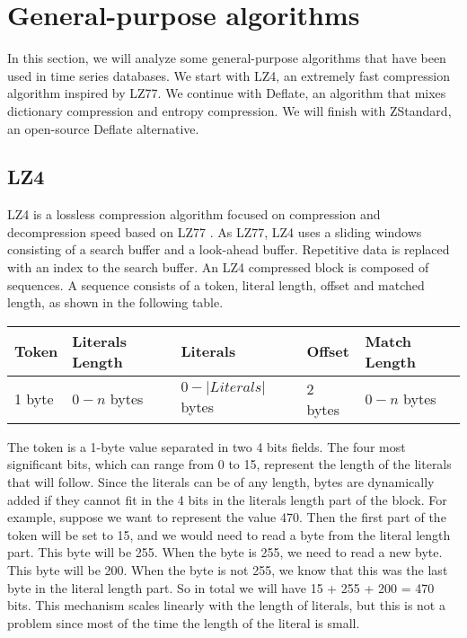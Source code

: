\section{General-purpose algorithms}
In this section, we will analyze some general-purpose algorithms that have been used in
time series databases. We start with LZ4, an extremely fast compression algorithm inspired
by LZ77. We continue with Deflate, an algorithm that mixes dictionary compression and entropy
compression. We will finish with ZStandard, an open-source Deflate alternative.

\subsection{LZ4}
LZ4 is a lossless compression algorithm focused on compression and decompression speed
based on LZ77 \cite{ziv1977universal}\cite{lz42019lz4lz4}. As LZ77, LZ4 uses a sliding windows
consisting of a search buffer and a look-ahead buffer. Repetitive data is replaced with
an index to the search buffer. An LZ4 compressed block is composed of sequences.
A sequence consists of a token, literal length, offset and matched length, as
shown in the following table.
\begin{table}[!htbp]
\centering
\begin{tabular}{l|l|l|l|l}
\textbf{Token} & \textbf{Literals Length} & \textbf{Literals} & \textbf{Offset} & \textbf{Match Length} \\ 
\hline
1 byte & $0-n$ bytes & $0-|Literals|$ bytes & 2 bytes & $0-n$ bytes \\
\end{tabular}
\end{table}
The token is a 1-byte value separated in two 4 bits fields. The four most significant bits,
which can range from 0 to 15, represent the length of the literals that will follow. Since
the literals can be of any length, bytes are dynamically added if they cannot fit in the 4
bits in the literals length part of the block. For example, suppose we want to represent
the value 470. Then the first part of the token will be set to 15, and we would need to
read a byte from the literal length part. This byte will be 255. When the byte is 255,
we need to read a new byte. This byte will be 200. When the byte is not 255, we know that
this was the last byte in the literal length part. So in total we will have
15 + 255 + 200 = 470 bits.
This mechanism scales linearly with the length of literals, but this is not a problem
since most of the time the length of the literal is small.
